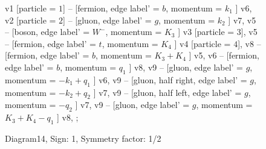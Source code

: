 \documentclass{revtex4}
\begin{document}
\begin{figure}[!htb]
\begin{center}
{    %
v1 [particle = \(1\)] -- [fermion, edge label' = \(b\), momentum = \(k_{1}\) ] v6, 
v2 [particle = \(2\)] -- [gluon, edge label' = \(g\), momentum = \(k_{2}\) ] v7, 
v5 -- [boson, edge label' = \(W^{-}\), momentum = \(K_{3}\) ] v3 [particle = \(3\)], 
v5 -- [fermion, edge label' = \(t\), momentum = \(K_{4}\) ] v4 [particle = \(4\)], 
v8 -- [fermion, edge label' = \(b\), momentum = \(K_{3} + K_{4}\) ] v5, 
v6 -- [fermion, edge label' = \(b\), momentum = \(q_{1}\) ] v8, 
v9 -- [gluon, edge label' = \(g\), momentum = \(-k_{1} + q_{1}\) ] v6, 
v9 -- [gluon, half right, edge label' = \(g\), momentum = \(-k_{2} + q_{2}\) ] v7, 
v9 -- [gluon, half left, edge label' = \(g\), momentum = \(-q_{2}\) ] v7, 
v9 -- [gluon, edge label' = \(g\), momentum = \(K_{3} + K_{4} - q_{1}\) ] v8, 
};
\end{center}
\caption{Diagram14, Sign: 1, Symmetry factor: 1/2}
\end{figure}
\newpage
\end{document}
